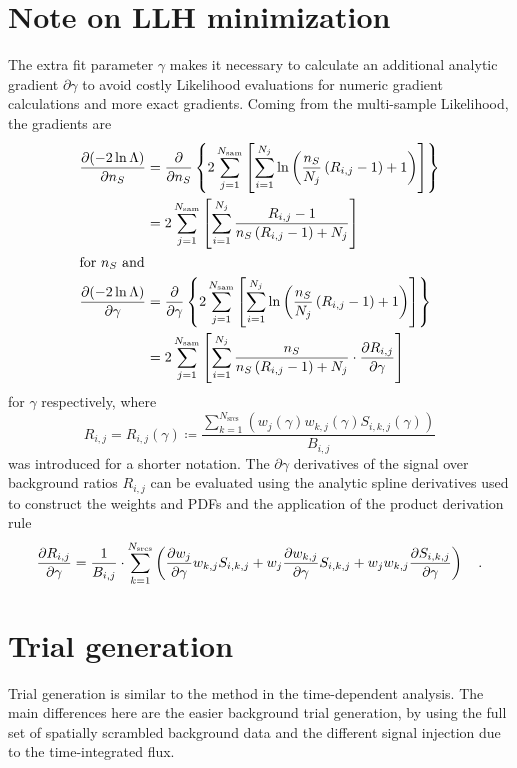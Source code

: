 \section{Note on LLH minimization}
The extra fit parameter $\gamma$ makes it necessary to calculate an additional analytic gradient $\partial{\gamma}$ to avoid costly Likelihood evaluations for numeric gradient calculations and more exact gradients.
Coming from the multi-sample Likelihood, the gradients are
\begin{align}
  \frac{\partial (-2\ln\Lambda)}{\partial n_S}
  &= \frac{\partial }{\partial n_S}\left\{
      2\sum_{j=1}^{N_\text{sam}} \left[
        \sum_{i=1}^{N_j} \ln\left(
          \frac{n_S}{N_j}\left( R_{i,j} - 1 \right) + 1
        \right)
      \right]
    \right\} \\
  &= 2\sum_{j=1}^{N_\text{sam}} \left[
      \sum_{i=1}^{N_j}
        \frac{R_{i,j} - 1}{n_S\left( R_{i,j} - 1 \right) + N_j}
      \right] \\
  \intertext{for $n_S$ and}
  \frac{\partial (-2\ln\Lambda)}{\partial \gamma}
  &= \frac{\partial }{\partial \gamma}\left\{
      2\sum_{j=1}^{N_\text{sam}} \left[
        \sum_{i=1}^{N_j} \ln\left(
          \frac{n_S}{N_j}\left( R_{i,j} - 1 \right) + 1
        \right)
      \right]
    \right\} \\
  &= 2\sum_{j=1}^{N_\text{sam}} \left[
      \sum_{i=1}^{N_j}
        \frac{n_S}{n_S\left( R_{i,j} - 1 \right) + N_j}\cdot
        \frac{\partial R_{i,j}}{\partial \gamma}
      \right] \\
\end{align}
for $\gamma$ respectively, where
\begin{equation}
  R_{i,j} = R_{i,j}(\gamma)
  \coloneqq \frac{\sum_{k=1}^{N_\text{srcs}}(w_j(\gamma)
                  w_{k,j}(\gamma) S_{i,k,j}(\gamma))}{B_{i,j}}
\end{equation}
was introduced for a shorter notation.
The $\partial{\gamma}$ derivatives of the signal over background ratios $R_{i,j}$ can be evaluated using the analytic spline derivatives used to construct the  weights and PDFs and the application of the product derivation rule
\begin{equation}
  \frac{\partial R_{i,j}}{\partial \gamma}
  = \frac{1}{B_{i,j}}\cdot\sum_{k=1}^{N_\text{srcs}}\left(
      \frac{\partial w_j}{\partial \gamma} w_{k,j} S_{i,k,j} +
      w_j \frac{\partial w_{k,j}}{\partial \gamma} S_{i,k,j} +
      w_j w_{k,j} \frac{\partial S_{i,k,j}}{\partial \gamma}
    \right)
  \quad\text{.}
\end{equation}


\section{Trial generation}
Trial generation is similar to the method in the time-dependent analysis.
The main differences here are the easier background trial generation, by using the full set of spatially scrambled background data and the different signal injection due to the time-integrated flux.

